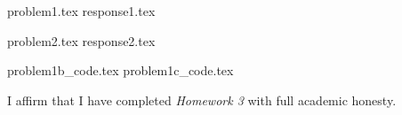 \documentclass[letterpaper, 12pt]{article}
\begin{document}

% 
{problem1.tex}
{response1.tex}

% 
{problem2.tex}
{response2.tex}


\appendix

{problem1b_code.tex}
{problem1c_code.tex}

\par

I affirm that I have completed \textit{Homework 3} with full academic honesty.
\end{document}
